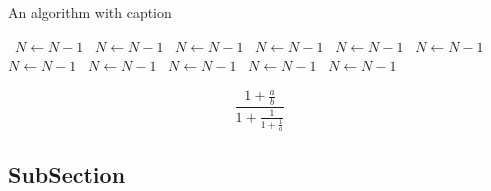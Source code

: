 \documentclass[a4paper]{article}
\begin{document}
\begin{algorithm}
\caption{An algorithm with caption}
\begin{algorithmic}
\    \State $N \gets N - 1$
\    \State $N \gets N - 1$
\    \State $N \gets N - 1$
\    \State $N \gets N - 1$
\    \State $N \gets N - 1$
\    \State $N \gets N - 1$
\    \State $N \gets N - 1$
\    \State $N \gets N - 1$
\    \State $N \gets N - 1$
\    \State $N \gets N - 1$
\    \State $N \gets N - 1$
\EndWhile
\end{algorithmic}
\end{algorithm}

\[ \frac{1+\frac{a}{b}}{1+\frac{1}{1+\frac{1}{a}}} \]

\subsection{SubSection}
\end{document}
